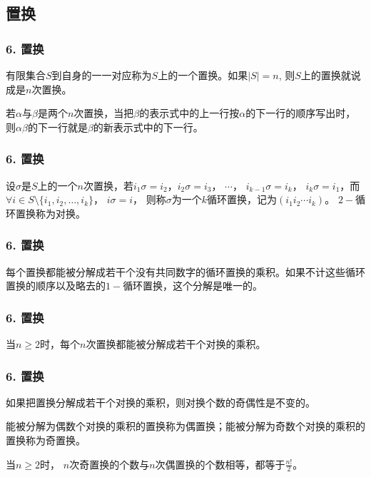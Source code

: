 \documentclass{beamer}
\begin{document}
\begin{CJK*}{UTF8}{gbsn}
\section{置换}
\begin{frame}
  \frametitle{6. 置换}
  \begin{Def}
    有限集合$S$到自身的一一对应称为$S$上的一个\alert{置换}。如果$|S| = n$, 则$S$上的置换就说成是\alert{$n$次置换}。
  \end{Def}\pause
  若$\alpha$与$\beta$是两个$n$次置换，当把$\beta$的表示式中的上一行按$\alpha$的下一行的顺序写出时，则$\alpha \beta$的下一行就是$\beta$的新表示式中的下一行。
 \end{frame}
 \begin{frame}
   \frametitle{6. 置换}
   \begin{Def}
     设$\sigma$是$S$上的一个$n$次置换，若$i_1\sigma=i_2$，$i_2\sigma = i_3$， $\cdots$， $i_{k-1}\sigma = i_k$， $i_k\sigma = i_1$，而$\forall i \in S\setminus \{i_1, i_2, \ldots, i_k\}$， $i\sigma = i$，
     则称$\sigma$为一个\alert{$k$循环置换}，记为$(i_1i_2\cdots i_k)$。 $2-$循环置换称为\alert{对换}。
   \end{Def}
 \end{frame}

 \begin{frame}
   \frametitle{6. 置换}
   \begin{Thm}
    每个置换都能被分解成若干个没有共同数字的循环置换的乘积。如果不计这些循环置换的顺序以及略去的$1-$循环置换，这个分解是唯一的。
   \end{Thm}
 \end{frame}

 \begin{frame}
   \frametitle{6. 置换}
   \begin{Thm}
    当$n\geq 2$时，每个$n$次置换都能被分解成若干个对换的乘积。
   \end{Thm}
 \end{frame}

 \begin{frame}
   \frametitle{6. 置换}
   \begin{Thm}
    如果把置换分解成若干个对换的乘积，则对换个数的奇偶性是不变的。
  \end{Thm}
  \pause
  \begin{Def}
    能被分解为偶数个对换的乘积的置换称为\alert{偶置换}；能被分解为奇数个对换的乘积的置换称为\alert{奇置换}。
  \end{Def}
  \pause
  \begin{Thm}
    当$n \geq 2$时， $n$次奇置换的个数与$n$次偶置换的个数相等，都等于$\frac{n!}{2}$。
  \end{Thm}
 \end{frame}


\end{CJK*}
\end{document}
